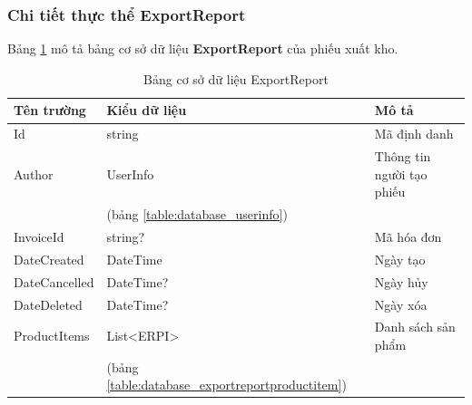 \documentclass[../DoAn.tex]{subfiles}
\begin{document}
\subsubsection{Chi tiết thực thể ExportReport}
\label{subsubsection:detaildesign-database-exportreport}
Bảng \ref{table:database_exportreport} mô tả bảng cơ sở dữ liệu \textbf{ExportReport} của phiếu xuất kho.
\begin{table}[H]
    \centering
    \begin{tabularx}{\textwidth}{|p{4cm}|p{3cm}|X|}
        \hline
        \textbf{Tên trường} & \textbf{Kiểu dữ liệu}                               & \textbf{Mô tả}            \\ \hline
        Id                  & string                                              & Mã định danh              \\ \hline
        Author              & UserInfo                                            & Thông tin người tạo phiếu \\
                            & (bảng \ref{table:database_userinfo})                &                           \\ \hline
        InvoiceId           & string?                                             & Mã hóa đơn                \\ \hline
        DateCreated         & DateTime                                            & Ngày tạo                  \\ \hline
        DateCancelled       & DateTime?                                           & Ngày hủy                  \\ \hline
        DateDeleted         & DateTime?                                           & Ngày xóa                  \\ \hline
        ProductItems        & List<ERPI>                                          & Danh sách sản phẩm        \\
                            & (bảng \ref{table:database_exportreportproductitem}) &                           \\ \hline
    \end{tabularx}
    \caption{Bảng cơ sở dữ liệu ExportReport}
    \label{table:database_exportreport}
\end{table}
\end{document}
